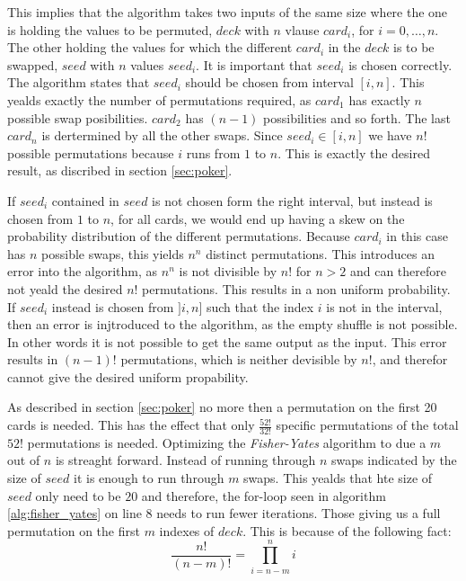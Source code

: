 \documentclass[twoside,11pt,openright]{report}
\newcommand{\FY}{\textit{Fisher-Yates} }
\begin{document}
This implies that the algorithm takes two inputs of the same size where the one is holding the values to be permuted, $deck$ with $n$ vlause $card_i$, for $i=0,\dots,n$. The other holding the values for which the different $card_i$ in the $deck$ is to be swapped, $seed$ with $n$ values $seed_i$. It is important that $seed_i$ is chosen correctly. The algorithm states that $seed_i$ should be chosen from interval $[i,n]$. This yealds exactly the number of permutations required, as $card_1$ has exactly $n$ possible swap posibilities. $card_2$ has $(n-1)$ possibilities and so forth. The last $card_n$ is dertermined by all the other swaps. Since $seed_i\in[i,n]$ we have $n!$ possible permutations because $i$ runs from $1$ to $n$. This is exactly the desired result, as discribed in section \ref{sec:poker}.

If $seed_i$ contained in $seed$ is not chosen form the right interval, but instead is chosen from $1$ to $n$, for all cards, we would end up having a skew on the probability distribution of the different permutations. Because $card_i$ in this case has $n$ possible swaps, this yields $n^n$ distinct permutations. This introduces an error into the algorithm, as $n^n$ is not divisible by $n!$ for $n>2$ and can therefore not yeald the desired $n!$ permutations. This results in a non uniform probability. If $seed_i$ instead is chosen from $]i,n]$ such that the index $i$ is not in the interval, then an error is injtroduced to the algorithm, as the empty shuffle is not possible. In other words it is not possible to get the same output as the input. This error results in $(n-1)!$ permutations, which is neither devisible by $n!$, and therefor cannot give the desired uniform propability.

\bigskip

As described in section \ref{sec:poker} no more then a permutation on the first 20 cards is needed. This has the effect that only $\frac{52!}{32!}$ specific permutations of the total $52!$ permutations is needed. Optimizing the \FY algorithm to due a $m$ out of $n$ is streaght forward. Instead of running through $n$ swaps indicated by the size of $seed$ it is enough to run through $m$ swaps. This yealds that hte size of $seed$ only need to be $20$ and therefore, the for-loop seen in algorithm \ref{alg:fisher_yates} on line $8$ needs to run fewer iterations. Those giving us a full permutation on the first $m$ indexes of $deck$. This is because of the following fact: $$\frac{n!}{(n-m)!} = \prod_{i=n-m}^n i$$

\bigskip
\end{document}
